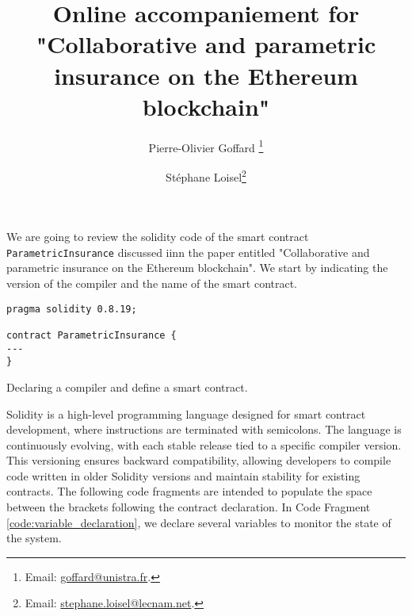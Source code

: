 \documentclass[10pt]{article}
\begin{document}
\title{Online accompaniement for "Collaborative and parametric insurance on the Ethereum blockchain"}
\author[1]{Pierre-Olivier Goffard \footnote{Email: \href{mailto:goffard@unistra.fr}{goffard@unistra.fr}.}}
\author[2]{Stéphane Loisel\footnote{Email: \href{mailto:stephane.loisel@lecnam.net}{stephane.loisel@lecnam.net}.}}

\maketitle
\vspace{3mm}


We are going to review the solidity code  of the smart contract \texttt{ParametricInsurance} discussed iinn the paper entitled "Collaborative and parametric insurance on the Ethereum blockchain". We start by indicating the version of the compiler and the name of the smart contract. 
\begin{codefragment}[!ht]
\begin{lstlisting}[language=Solidity]
pragma solidity 0.8.19;

contract ParametricInsurance {
---
}
\end{lstlisting}
    \caption{Declaring a compiler and define a smart contract.}
    \label{code:contractdeclaration}
\end{codefragment}
Solidity is a high-level programming language designed for smart contract development, where instructions are terminated with semicolons. The language is continuously evolving, with each stable release tied to a specific compiler version. This versioning ensures backward compatibility, allowing developers to compile code written in older Solidity versions and maintain stability for existing contracts. The following code fragments are intended to populate the space between the brackets following the contract declaration. In Code Fragment \ref{code:variable_declaration}, we declare several variables to monitor the state of the system.
\end{document}
